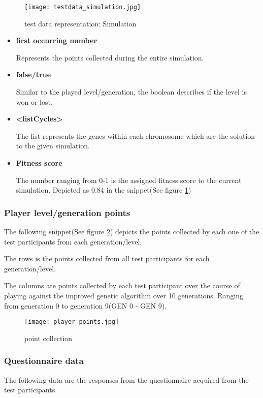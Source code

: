 \begin{figure}[!htbp]
\centering
\texttt{[image: testdata\_simulation.jpg]}
\caption{test data representation: Simulation}
\label{fig:testdata_simulation}
\end{figure}

\begin{itemize}
\item \textbf{first occurring number}

Represents the points collected during the entire simulation.

\item  \textbf{false/true}

Similar to the played level/generation, the boolean describes if the level is won or lost.

\item \textbf{<listCycles>}

The list represents the genes within each chromosome which are the solution to the given simulation.

\item \textbf{Fitness score}

The number ranging from 0-1 is the assigned fitness score to the current simulation. Depicted as 0.84 in the snippet(See figure \ref{fig:testdata_simulation})
\end{itemize}
\newpage
\subsubsection{Player level/generation points}
The following snippet(See figure \ref{fig:point_collection}) depicts the points collected by each one of the test participants from each generation/level.


The rows is the points collected from all test participants for each generation/level.

The columns are points collected by each test participant over the course of playing against the improved genetic algorithm over 10 generations. Ranging from generation 0 to generation 9(GEN 0 - GEN 9).
\begin{figure}[!htbp]
\centering
\texttt{[image: player\_points.jpg]}
\caption{point collection}
\label{fig:point_collection}
\end{figure}

\newpage
\subsubsection{Questionnaire data}
The following data are the responses from the questionnaire acquired from the test participants.

